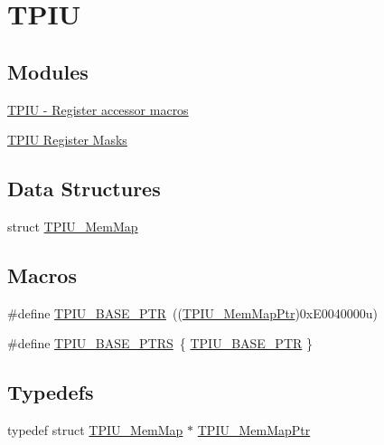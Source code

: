 \hypertarget{group___t_p_i_u___peripheral}{}\section{T\+P\+I\+U}
\label{group___t_p_i_u___peripheral}
\subsection*{Modules}
\begin{DoxyCompactItemize}
\item 
\hyperlink{group___t_p_i_u___register___accessor___macros}{T\+P\+I\+U -\/ Register accessor macros}
\item 
\hyperlink{group___t_p_i_u___register___masks}{T\+P\+I\+U Register Masks}
\end{DoxyCompactItemize}
\subsection*{Data Structures}
\begin{DoxyCompactItemize}
\item 
struct \hyperlink{struct_t_p_i_u___mem_map}{T\+P\+I\+U\+\_\+\+Mem\+Map}
\end{DoxyCompactItemize}
\subsection*{Macros}
\begin{DoxyCompactItemize}
\item 
\#define \hyperlink{group___t_p_i_u___peripheral_ga9294dc3ec1881014ac83408db60de6a0}{T\+P\+I\+U\+\_\+\+B\+A\+S\+E\+\_\+\+P\+T\+R}~((\hyperlink{group___t_p_i_u___peripheral_ga300f3eea21a542970734e2c9c0953f4f}{T\+P\+I\+U\+\_\+\+Mem\+Map\+Ptr})0x\+E0040000u)
\item 
\#define \hyperlink{group___t_p_i_u___peripheral_ga3d9db14d6200532bc2307ba24bd4f4e9}{T\+P\+I\+U\+\_\+\+B\+A\+S\+E\+\_\+\+P\+T\+R\+S}~\{ \hyperlink{group___t_p_i_u___peripheral_ga9294dc3ec1881014ac83408db60de6a0}{T\+P\+I\+U\+\_\+\+B\+A\+S\+E\+\_\+\+P\+T\+R} \}
\end{DoxyCompactItemize}
\subsection*{Typedefs}
\begin{DoxyCompactItemize}
\item 
typedef struct \hyperlink{struct_t_p_i_u___mem_map}{T\+P\+I\+U\+\_\+\+Mem\+Map} $\ast$ \hyperlink{group___t_p_i_u___peripheral_ga300f3eea21a542970734e2c9c0953f4f}{T\+P\+I\+U\+\_\+\+Mem\+Map\+Ptr}
\end{DoxyCompactItemize}


